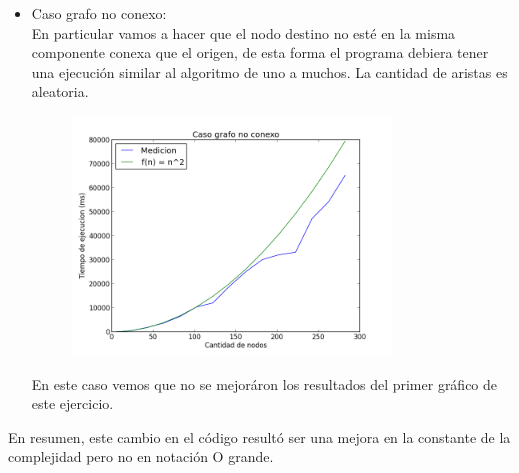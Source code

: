\begin{itemize}
\begin{figure}[H]
  \label{fig: ej1_exp1_columnas}
\end{figure}
    En este caso vemos que no hay una diferencia significativa entre ambos casos lo cual quiere decir que no hay tanta diferencia en la cantidad de nodos visitados entre ambos casos. Adem\'as vemos que hay un crecimiento a medida que la cantidad de nodos aumenta, la causa de este comportamiento debe ser que al ser un grafo completo se tarda bastante en construirse, no que se recorren m\'as nodos hasta llegar al nodo final.
    \item Caso grafo no conexo:\\
    En particular vamos a hacer que el nodo destino no est\'e en la misma componente conexa que el origen, de esta forma el programa debiera tener una ejecuci\'on similar al algoritmo de uno a muchos. La cantidad de aristas es aleatoria.
    \begin{figure}[H]
  \centering
  \includegraphics[width=0.8\textwidth]{Problema3/salida7}
  
  \label{fig: ej1_exp1_columnas}
\end{figure}
    En este caso vemos que no se mejor\'aron los resultados del primer gr\'afico de este ejercicio.
\end{itemize}

En resumen, este cambio en el c\'odigo result\'o ser una mejora en la constante de la complejidad pero no en notaci\'on O grande.

